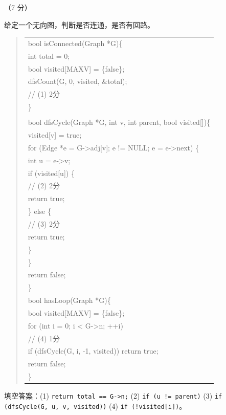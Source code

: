 \begin{question}[无向图连通性与回路判定]（7 分）

给定一个无向图，判断是否连通，是否有回路。

\begin{quote}
\footnotesize
\begin{tabular}{@{}l@{}}
bool isConnected(Graph *G)\{\\
    int total = 0;\\
    bool visited[MAXV] = \{false\};\\
    dfsCount(G, 0, visited, \&total);\\
\underline{\hspace{12em}} // (1) 2分\\
\}\\
\\
bool dfsCycle(Graph *G, int v, int parent, bool visited[])\{\\
    visited[v] = true;\\
    for (Edge *e = G->adj[v]; e != NULL; e = e->next) \{\\
        int u = e->v;\\
        if (visited[u]) \{\\
\underline{\hspace{12em}} // (2) 2分\\
                return true;\\
        \} else \{\\
\underline{\hspace{12em}} // (3) 2分\\
                return true;\\
        \}\\
    \}\\
    return false;\\
\}\\
bool hasLoop(Graph *G)\{\\
    bool visited[MAXV] = \{false\};\\
    for (int i = 0; i < G->n; ++i)\\
\underline{\hspace{12em}} // (4) 1分\\
            if (dfsCycle(G, i, -1, visited)) return true;\\
    return false;\\
\}\end{tabular}
\end{quote}

\begin{solution}
填空答案：(1) \texttt{return total == G->n;} (2) \texttt{if (u != parent)} (3) \texttt{if (dfsCycle(G, u, v, visited))} (4) \texttt{if (!visited[i])}。
\end{solution}
\end{question}

